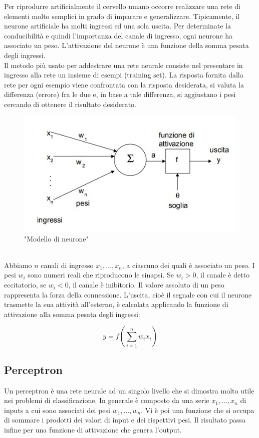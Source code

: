 \documentclass[a4paper,11pt]{article}
\begin{document}
    Per riprodurre artificialmente il cervello umano occorre realizzare
    una rete di elementi molto semplici in grado di imparare e generalizzare.
    Tipicamente, il neurone artificiale ha molti ingressi ed una sola uscita.
    Per determinate la conducibilità e quindi l'importanza del canale di ingresso, ogni neurone ha associato un peso. 
    L’attivazione del neurone è una funzione della somma pesata degli ingressi.\\[1in]
    Il metodo più usato per addestrare una rete neurale consiste nel presentare
    in ingresso alla rete un insieme di esempi (training set). 
    La risposta fornita dalla rete per ogni esempio viene confrontata con la risposta desiderata, si
    valuta la differenza (errore) fra le due e, in base a tale differenza, si
    aggiustano i pesi cercando di ottenere il risultato desiderato.
    \begin{figure}[h]
        \centering
        \includegraphics{neurone.jpg}
        \caption{"Modello di neurone"}
    \end{figure}
    \\Abbiamo $n$ canali di ingresso $x_1, …, x_n$, a ciascuno dei quali è associato un peso. 
    I pesi $w_i$ sono numeri reali che riproducono le sinapsi. Se $w_i > 0$, il canale è detto eccitatorio, se $w_i < 0$, il canale è inibitorio. 
    Il valore assoluto di un peso rappresenta la forza della connessione. 
    L’uscita, cioè il segnale con cui il neurone trasmette la sua attività
    all’esterno, è calcolata applicando la funzione di attivazione alla somma
    pesata degli ingressi:
    
    $$y = f(\sum_{i=1}^{n}w_i x_i)$$

    \subsection{Perceptron}
    Un perceptron è una rete neurale ad un singolo livello che si dimostra molto utile nei problemi di classificazione.
    In generale è composto da una serie $x_1, ..., x_n$ di inputs a cui sono associati dei pesi $w_1, ..., w_n$. 
    Vi è poi una funzione che si occupa di sommare i prodotti dei valori di input e dei rispettivi pesi. 
    Il risultato passa infine per una funzione di attivazione che genera l'output.
\end{document}
